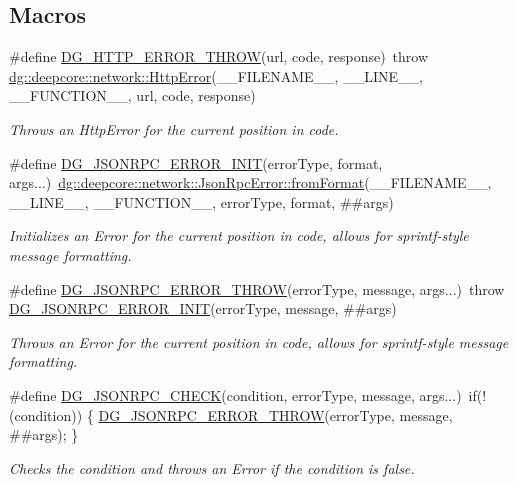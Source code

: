 \subsection*{Macros}
\begin{DoxyCompactItemize}
\item 
\#define \hyperlink{group___network_module_gaa6c6ffb478681996c90ec197922be05f}{D\+G\+\_\+\+H\+T\+T\+P\+\_\+\+E\+R\+R\+O\+R\+\_\+\+T\+H\+R\+OW}(url,  code,  response)~throw \hyperlink{classdg_1_1deepcore_1_1network_1_1_http_error}{dg\+::deepcore\+::network\+::\+Http\+Error}(\+\_\+\+\_\+\+F\+I\+L\+E\+N\+A\+M\+E\+\_\+\+\_\+, \+\_\+\+\_\+\+L\+I\+N\+E\+\_\+\+\_\+, \+\_\+\+\_\+\+F\+U\+N\+C\+T\+I\+O\+N\+\_\+\+\_\+, url, code, response)
\begin{DoxyCompactList}\small\item\em Throws an Http\+Error for the current position in code. \end{DoxyCompactList}\item 
\#define \hyperlink{group___network_module_ga5d3ae0eeb5ece752717325264ad99eb6}{D\+G\+\_\+\+J\+S\+O\+N\+R\+P\+C\+\_\+\+E\+R\+R\+O\+R\+\_\+\+I\+N\+IT}(error\+Type,  format,  args...)~\hyperlink{group___network_module_ga2fdfe2154c20e91cb5f0205ced658714}{dg\+::deepcore\+::network\+::\+Json\+Rpc\+Error\+::from\+Format}(\+\_\+\+\_\+\+F\+I\+L\+E\+N\+A\+M\+E\+\_\+\+\_\+, \+\_\+\+\_\+\+L\+I\+N\+E\+\_\+\+\_\+, \+\_\+\+\_\+\+F\+U\+N\+C\+T\+I\+O\+N\+\_\+\+\_\+, error\+Type, format, \#\#args)
\begin{DoxyCompactList}\small\item\em Initializes an Error for the current position in code, allows for sprintf-\/style message formatting. \end{DoxyCompactList}\item 
\#define \hyperlink{group___network_module_gadd35b045ee5354e068ed791830ed16cb}{D\+G\+\_\+\+J\+S\+O\+N\+R\+P\+C\+\_\+\+E\+R\+R\+O\+R\+\_\+\+T\+H\+R\+OW}(error\+Type,  message,  args...)~throw \hyperlink{group___network_module_ga5d3ae0eeb5ece752717325264ad99eb6}{D\+G\+\_\+\+J\+S\+O\+N\+R\+P\+C\+\_\+\+E\+R\+R\+O\+R\+\_\+\+I\+N\+IT}(error\+Type, message, \#\#args)
\begin{DoxyCompactList}\small\item\em Throws an Error for the current position in code, allows for sprintf-\/style message formatting. \end{DoxyCompactList}\item 
\#define \hyperlink{group___network_module_ga1025d0a05a0a01a8c72126b4b3a208bf}{D\+G\+\_\+\+J\+S\+O\+N\+R\+P\+C\+\_\+\+C\+H\+E\+CK}(condition,  error\+Type,  message,  args...)~if(!(condition)) \{ \hyperlink{group___network_module_gadd35b045ee5354e068ed791830ed16cb}{D\+G\+\_\+\+J\+S\+O\+N\+R\+P\+C\+\_\+\+E\+R\+R\+O\+R\+\_\+\+T\+H\+R\+OW}(error\+Type, message, \#\#args); \}
\begin{DoxyCompactList}\small\item\em Checks the condition and throws an Error if the condition is false. \end{DoxyCompactList}\end{DoxyCompactItemize}
